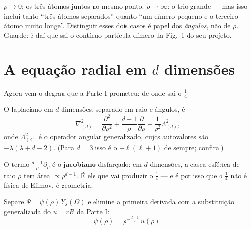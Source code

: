 \documentclass[11pt,a4paper]{article}
\begin{document}
\begin{atencao}
$\rho\to 0$: os três átomos juntos no mesmo ponto. $\rho\to\infty$: o trio grande ---
mas isso inclui tanto ``três átomos separados'' quanto ``um dímero pequeno e o
terceiro átomo muito longe''. Distinguir esses dois casos é papel dos \emph{ângulos},
não de $\rho$. Guarde: é daí que sai o contínuo partícula-dímero da Fig.~1 do seu
projeto.
\end{atencao}

\section{A equação radial em \texorpdfstring{$d$}{d} dimensões}
\label{sec:radial}

Agora vem o degrau que a Parte I prometeu: de onde sai o $\tfrac14$.

O laplaciano em $d$ dimensões, separado em raio e ângulos, é
\begin{equation}
\nabla^{2}_{(d)} = \frac{\partial^{2}}{\partial\rho^{2}}
+ \frac{d-1}{\rho}\frac{\partial}{\partial\rho}
+ \frac{1}{\rho^{2}}\Lambda^{2}_{(d)},
\label{eq:lapd}
\end{equation}
onde $\Lambda^{2}_{(d)}$ é o operador angular generalizado, cujos autovalores são
$-\lambda(\lambda+d-2)$. (Para $d=3$ isso é o $-\ell(\ell+1)$ de sempre; confira.)

O termo $\frac{d-1}{\rho}\partial_{\rho}$ é o \textbf{jacobiano} disfarçado: em $d$
dimensões, a casca esférica de raio $\rho$ tem área $\propto \rho^{d-1}$. É ele que
vai produzir o $\tfrac14$ --- e é por isso que o $\tfrac14$ não é física de Efimov, é
geometria.

Separe $\Psi = \psi(\rho)\,Y_{\lambda}(\Omega)$ e elimine a primeira derivada com a
substituição generalizada do $u=rR$ da Parte I:
\begin{equation}
\boxed{\;\psi(\rho) = \rho^{-\frac{d-1}{2}}\,u(\rho).\;}
\label{eq:sub}
\end{equation}
\end{document}
